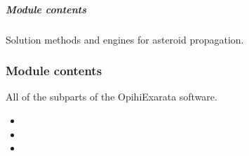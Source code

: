 \documentclass[letterpaper,11pt,english]{sphinxmanual}
\begin{document}
\subparagraph{Module contents}
\label{\detokenize{code/opihiexarata.propagate:module-opihiexarata.propagate}}\label{\detokenize{code/opihiexarata.propagate:module-contents}}
\sphinxAtStartPar
Solution methods and engines for asteroid propagation.


\subsubsection{Module contents}
\label{\detokenize{code/opihiexarata:module-opihiexarata}}\label{\detokenize{code/opihiexarata:module-contents}}
\sphinxAtStartPar
All of the subparts of the OpihiExarata software.
\begin{itemize}
\item {} 
\sphinxAtStartPar
{}

\item {} 
\sphinxAtStartPar
{}

\item {} 
\sphinxAtStartPar
{}

\end{itemize}
\end{document}
